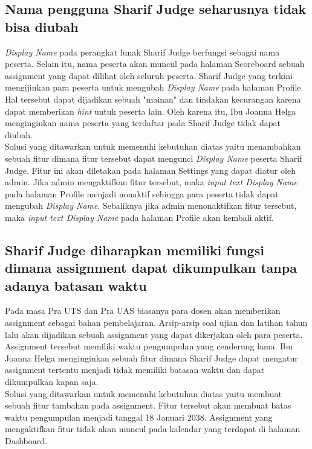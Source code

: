 \subsection{Nama pengguna Sharif Judge seharusnya tidak bisa diubah}
\textit{Display Name} pada perangkat lunak Sharif Judge berfungsi sebagai nama peserta. Selain itu, nama peserta akan muncul pada halaman Scoreboard sebuah assignment yang dapat dilihat oleh seluruh peserta. Sharif Judge yang terkini mengijinkan para peserta untuk mengubah \textit{Display Name} pada halaman Profile. Hal tersebut dapat dijadikan sebuah "mainan" dan tindakan kecurangan karena dapat memberikan \textit{hint} untuk peserta lain. Oleh karena itu, Ibu Joanna Helga menginginkan nama peserta yang terdaftar pada Sharif Judge tidak dapat diubah. \\
Solusi yang ditawarkan untuk memenuhi kebutuhan diatas yaitu menambahkan sebuah fitur dimana fitur tersebut dapat mengunci \textit{Display Name} peserta Sharif Judge. Fitur ini akan diletakan pada halaman Settings yang dapat diatur oleh admin. Jika admin mengaktifkan fitur tersebut, maka \textit{input text Display Name} pada halaman Profile menjadi nonaktif sehingga para peserta tidak dapat mengubah \textit{Display Name}. Sebaliknya jika admin menonaktifkan fitur tersebut, maka \textit{input text Display Name} pada halaman Profile akan kembali aktif.


\subsection{Sharif Judge diharapkan memiliki fungsi dimana assignment dapat dikumpulkan tanpa adanya batasan waktu}
Pada masa Pra UTS dan Pra UAS biasanya para dosen akan memberikan assignment sebagai bahan pembelajaran. Arsip-arsip soal ujian dan latihan tahun lalu akan dijadikan sebuah assignment yang dapat dikerjakan oleh para peserta. Assignment tersebut memiliki waktu pengumpulan yang cenderung lama. Ibu Joanna Helga menginginkan sebuah fitur dimana Sharif Judge dapat mengatur assignment tertentu menjadi tidak memiliki batasan waktu dan dapat dikumpulkan kapan saja. \\
Solusi yang ditawarkan untuk memenuhi kebutuhan diatas yaitu membuat sebuah fitur tambahan pada assignment. Fitur tersebut akan membuat batas waktu pengumpulan menjadi tanggal 18 Januari 2038. Assignment yang mengaktifkan fitur tidak akan muncul pada kalendar yang terdapat di halaman Dashboard.

